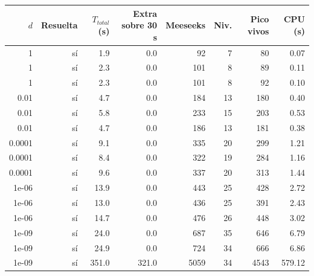 \begin{tabular}{rrrrrrrr}
\toprule
$d$ & Resuelta & $T_{total}$ (s) & Extra sobre 30 s & Meeseeks & Niv. & Pico vivos & CPU (s) \\
\midrule
1 & sí & 1.9 & 0.0 & 92 & 7 & 80 & 0.07 \\
1 & sí & 2.3 & 0.0 & 101 & 8 & 89 & 0.11 \\
1 & sí & 2.3 & 0.0 & 101 & 8 & 92 & 0.10 \\
0.01 & sí & 4.7 & 0.0 & 184 & 13 & 180 & 0.40 \\
0.01 & sí & 5.8 & 0.0 & 233 & 15 & 203 & 0.53 \\
0.01 & sí & 4.7 & 0.0 & 186 & 13 & 181 & 0.38 \\
0.0001 & sí & 9.1 & 0.0 & 335 & 20 & 299 & 1.21 \\
0.0001 & sí & 8.4 & 0.0 & 322 & 19 & 284 & 1.16 \\
0.0001 & sí & 9.6 & 0.0 & 337 & 20 & 313 & 1.44 \\
1e-06 & sí & 13.9 & 0.0 & 443 & 25 & 428 & 2.72 \\
1e-06 & sí & 13.0 & 0.0 & 436 & 25 & 391 & 2.43 \\
1e-06 & sí & 14.7 & 0.0 & 476 & 26 & 448 & 3.02 \\
1e-09 & sí & 24.0 & 0.0 & 687 & 35 & 646 & 6.79 \\
1e-09 & sí & 24.9 & 0.0 & 724 & 34 & 666 & 6.86 \\
1e-09 & sí & 351.0 & 321.0 & 5059 & 34 & 4543 & 579.12 \\
\bottomrule
\end{tabular}
